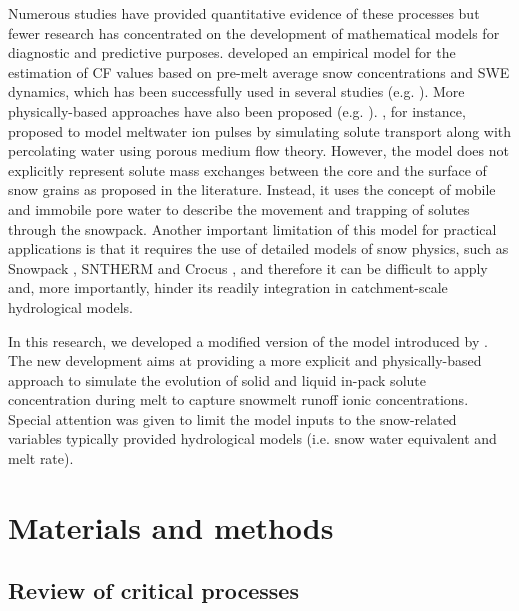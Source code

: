 \documentclass[authoryear,preprint,review,12pt]{elsarticle}
\begin{document}
Numerous studies have provided quantitative evidence of these processes but fewer research has concentrated on the development of mathematical models for diagnostic and predictive purposes. \citet{Stein1986} developed an empirical model for the estimation of CF values based on pre-melt average snow concentrations and SWE dynamics, which has been successfully used in several studies (e.g. \citealp{Costa2017}). More physically-based approaches have also been proposed (e.g. \citet{Hibberd1984,Bales1991,Harrington1998}). \citet{Harrington1998}, for instance, proposed to model meltwater ion pulses by simulating solute transport along with percolating water using porous medium flow theory. However, the model does not explicitly represent solute mass exchanges between the core and the surface of snow grains as proposed in the literature. Instead, it uses the concept of mobile and immobile pore water to describe the movement and trapping of solutes through the snowpack. Another important limitation of this model for practical applications is that it requires the use of detailed models of snow physics, such as Snowpack \citep{Bartelt2002,Lehning2002a,Lehning2002}, SNTHERM \citep{Jordan1991} and Crocus \citep{Brun1992}, and therefore it can be difficult to apply and, more importantly, hinder its readily integration in catchment-scale hydrological models. \par

In this research, we developed a modified version of the model introduced by \citet{Harrington1998}. The new development aims at providing a more explicit and physically-based approach to simulate the evolution of solid and liquid in-pack solute concentration during melt to capture snowmelt runoff ionic concentrations. Special attention was given to limit the model inputs to the snow-related variables typically provided hydrological models (i.e. snow water equivalent and melt rate). %


\section{Materials and methods}
\label{chapter:materialsandmethods}

\subsection{Review of critical processes}
\par
\end{document}
